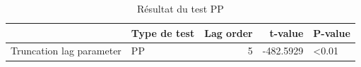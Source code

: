 \begin{table}[!h]
\centering
\caption{Résultat du test PP}
\centering
\begin{tabular}[t]{llrrl}
\toprule
  & Type de test & Lag order & t-value & P-value\\
\midrule
Truncation lag parameter & PP & 5 & -482.5929 & <0.01\\
\bottomrule
\end{tabular}
\end{table}
